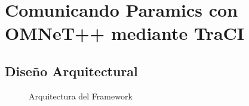 \chapter{Comunicando Paramics con OMNeT++ mediante TraCI}
\section{Diseño Arquitectural}



\begin{figure}[b]
    \centering
    
    \caption{Arquitectura del Framework}
    \label{fig:ptraci_arch}
\end{figure}
